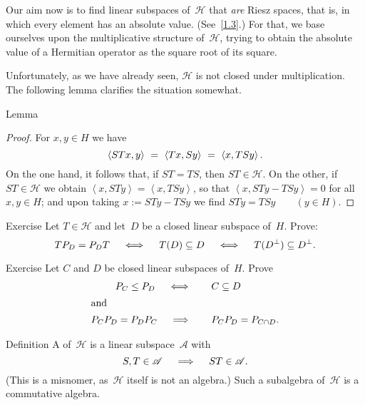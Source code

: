 \documentclass[main.tex]{subfiles}
\begin{document}
\noindent Our aim now is to find
linear subspaces of~$\mathscr H$
that \emph{are} Riesz spaces,
that is,
in which every element has an absolute value.
(See~\ref{1.3}.)
For that,
we base ourselves upon
the multiplicative structure of~$\mathscr H$,
trying to obtain the absolute value of a Hermitian operator
as the square root of its square.

Unfortunately,
as we have already seen,
$\mathscr H$ is not closed under multiplication.
The following lemma clarifies the situation somewhat.
%
%
\begin{psec}{5.12}{Lemma}\end{psec}
\begin{proof}
For $x,y\in H$ we have
\begin{equation*}
\left< STx,y\right>\ =\ \left<Tx,Sy\right>\ =\ \left<x,TSy\right>\htam{.}
\end{equation*}
On the one hand,
it follows that,
if $ST=TS$,
then $ST\in\mathscr H$.
On the other,
if $ST\in\mathscr H$
we obtain $\left< x,STy\right>=\left<x,TSy\right>$,
so that $\left<x,STy-TSy\right>=0$
for all $x,y\in H$;
and upon taking $x:=STy-TSy$
we find $STy=TSy \qquad (y\in H)$. \xqed
\end{proof}
%
%
\begin{psec}{5.13}{Exercise}
Let $T\in\mathscr H$ and let~$D$ be a closed linear subspace of~$H$.
Prove:
\begin{equation*}
TP_D = P_D T 
\quad \iff \quad T(D)\subseteq D
\quad \iff \quad T(D^\perp)\subseteq D^\perp\text{.}
\end{equation*}
\end{psec}
%
%
\begin{psec}{5.14}{Exercise}
Let $C$ and $D$ be closed linear subspaces of~$H$.
Prove 
\begin{alignat*}{2}
P_C\leq P_D\quad \iff& \quad &&C\subseteq D\\
\intertext{and}
P_C P_D=P_D P_C \quad \implies& \quad &&P_C P_D = P_{C\cap D}\htam{.}
\end{alignat*}
\end{psec}
%
%
\begin{psec}{5.15}{Definition}
A  of~$\mathscr H$
is a linear subspace~$\mathscr{A}$ with
\begin{equation*}
S,T\in\mathscr A \quad \implies \quad ST\in\mathscr A\text{.}
\end{equation*}
(This is a misnomer,
as~$\mathscr H$ itself is not an algebra.)
Such a subalgebra of~$\mathscr H$
is a commutative algebra.
\end{psec}
\end{document}
